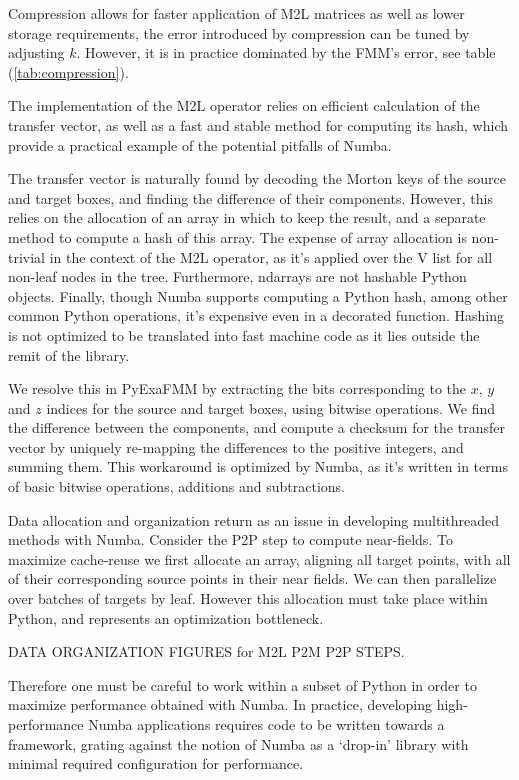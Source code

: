 \documentclass{IEEEcsmag}
\begin{document}
Compression allows for faster application of M2L matrices as well as lower storage requirements, the error introduced by compression can be tuned by adjusting $k$. However, it is in practice dominated by the FMM's error, see table (\ref{tab:compression}).

The implementation of the M2L operator relies on efficient calculation of the transfer vector, as well as a fast and stable method for computing its hash, which provide a practical example of the potential pitfalls of Numba.

The transfer vector is naturally found by decoding the Morton keys of the source and target boxes, and finding the difference of their components. However, this relies on the allocation of an array in which to keep the result, and a separate method to compute a hash of this array. The expense of array allocation is non-trivial in the context of the M2L operator, as it's applied over the V list for all non-leaf nodes in the tree. Furthermore, ndarrays are not hashable Python objects. Finally, though Numba supports computing a Python hash, among other common Python operations, it's expensive even in a decorated function. Hashing is not optimized to be translated into fast machine code as it lies outside the remit of the library.

We resolve this in PyExaFMM by extracting the bits corresponding to the $x$, $y$ and $z$ indices for the source and target boxes, using bitwise operations. We find the difference between the components, and compute a checksum for the transfer vector by uniquely re-mapping the differences to the positive integers, and summing them. This workaround is optimized by Numba, as it's written in terms of basic bitwise operations, additions and subtractions.

Data allocation and organization return as an issue in developing multithreaded methods with Numba. Consider the P2P step to compute near-fields. To maximize cache-reuse we first allocate an array, aligning all target points, with all of their corresponding source points in their near fields. We can then parallelize over batches of targets by leaf. However this allocation must take place within Python, and represents an optimization bottleneck.

DATA ORGANIZATION FIGURES for M2L P2M P2P STEPS.

Therefore one must be careful to work within a subset of Python in order to maximize performance obtained with Numba. In practice, developing high-performance Numba applications requires code to be written towards a framework, grating against the notion of Numba as a `drop-in' library with minimal required configuration for performance.
\end{document}

